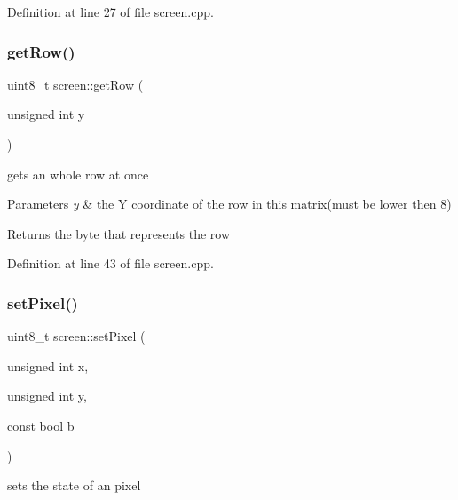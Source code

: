 Definition at line 27 of file screen.\+cpp.

\mbox{\label{classscreen_a06ba2227cb388ba2365e2042cd2022c0}} 
\subsubsection{\texorpdfstring{get\+Row()}{getRow()}}
{\footnotesize\ttfamily uint8\+\_\+t screen\+::get\+Row (\begin{DoxyParamCaption}\item[{unsigned int}]{y }\end{DoxyParamCaption})}



gets an whole row at once 


\begin{DoxyParams}{Parameters}
{\em y} & the Y coordinate of the row in this matrix(must be lower then 8) \\
\hline
\end{DoxyParams}
\begin{DoxyReturn}{Returns}
the byte that represents the row 
\end{DoxyReturn}


Definition at line 43 of file screen.\+cpp.

\mbox{\label{classscreen_a1d757204ed919e555c19f56a2131b331}} 
\subsubsection{\texorpdfstring{set\+Pixel()}{setPixel()}}
{\footnotesize\ttfamily uint8\+\_\+t screen\+::set\+Pixel (\begin{DoxyParamCaption}\item[{unsigned int}]{x,  }\item[{unsigned int}]{y,  }\item[{const bool}]{b }\end{DoxyParamCaption})}



sets the state of an pixel 

